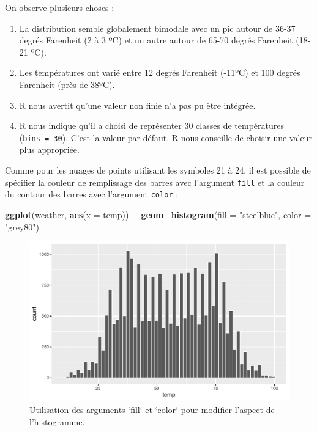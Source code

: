 \documentclass[
  a4paper,
]{article}
\newenvironment{Shaded}{\begin{snugshade}}{\end{snugshade}}
\newcommand{\DataTypeTok}[1]{\textcolor[rgb]{0.00,0.34,0.68}{#1}}
\newcommand{\KeywordTok}[1]{\textcolor[rgb]{0.12,0.11,0.11}{\textbf{#1}}}
\newcommand{\NormalTok}[1]{\textcolor[rgb]{0.12,0.11,0.11}{#1}}
\newcommand{\OperatorTok}[1]{\textcolor[rgb]{0.12,0.11,0.11}{#1}}
\newcommand{\StringTok}[1]{\textcolor[rgb]{0.75,0.01,0.01}{#1}}
\providecommand{\tightlist}{%
  \setlength{\itemsep}{0pt}\setlength{\parskip}{0pt}}
\begin{document}
On observe plusieurs choses :

\begin{enumerate}
\def\labelenumi{\arabic{enumi}.}
\tightlist
\item
  La distribution semble globalement bimodale avec un pic autour de 36-37 degrés Farenheit (2 à 3 ºC) et un autre autour de 65-70 degrés Farenheit (18-21 ºC).
\item
  Les températures ont varié entre 12 degrés Farenheit (-11ºC) et 100 degrés Farenheit (près de 38ºC).
\item
  R nous avertit qu'une valeur non finie n'a pas pu être intégrée.
\item
  R nous indique qu'il a choisi de représenter 30 classes de températures (\texttt{bins\ =\ 30}). C'est la valeur par défaut. R nous conseille de choisir une valeur plus appropriée.
\end{enumerate}

Comme pour les nuages de points utilisant les symboles 21 à 24, il est possible de spécifier la couleur de remplissage des barres avec l'argument \texttt{fill} et la couleur du contour des barres avec l'argument \texttt{color} :

\begin{Shaded}
\begin{Highlighting}[]
\KeywordTok{ggplot}\NormalTok{(weather, }\KeywordTok{aes}\NormalTok{(}\DataTypeTok{x =}\NormalTok{ temp)) }\OperatorTok{+}
\StringTok{  }\KeywordTok{geom_histogram}\NormalTok{(}\DataTypeTok{fill =} \StringTok{"steelblue"}\NormalTok{, }\DataTypeTok{color =} \StringTok{"grey80"}\NormalTok{)}
\end{Highlighting}
\end{Shaded}

\begin{figure}[htpb]

{\centering \includegraphics[width=0.9\linewidth]{figure/unnamed-chunk-48-1} 

}

\caption{Utilisation des arguments `fill` et `color` pour modifier l'aspect de l'histogramme.}\label{fig:unnamed-chunk-48}
\end{figure}
\end{document}
